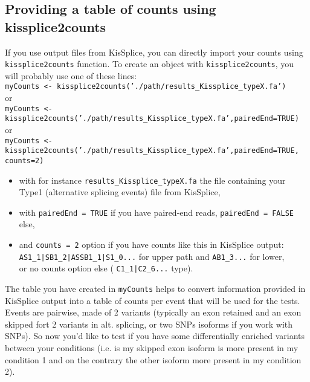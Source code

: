 \documentclass[english, a4paper, 12pt]{article}
\begin{document}

\subsection{Providing a table of counts using kissplice2counts}
If you use output files from KisSplice, you can directly import your counts using \texttt{kissplice2counts} function.
To create an object with \texttt{kissplice2counts}, you will probably use one of these lines:\\

  \texttt{myCounts <- kissplice2counts('./path/results\_Kissplice\_typeX.fa')}\\

or \\
  \texttt{myCounts <- kissplice2counts('./path/results\_Kissplice\_typeX.fa',pairedEnd=TRUE)}\\

or\\
  \texttt{myCounts <- kissplice2counts('./path/results\_Kissplice\_typeX.fa',pairedEnd=TRUE, counts=2)}\\

\begin{itemize}
\item with for instance \texttt{results\_Kissplice\_typeX.fa} the file containing your Type1 (alternative splicing events) file from KisSplice,
 \item  with \texttt{pairedEnd = TRUE} if you have paired-end reads, \texttt{pairedEnd = FALSE} else, 
 \item  and \texttt{counts = 2} option if you have counts like this in KisSplice output:\\
 \texttt{AS1\_1|SB1\_2|ASSB1\_1|S1\_0...} for upper path and \texttt{AB1\_3...} for lower,\\
      or no counts option else ( \texttt{C1\_1|C2\_6...} type).
\end{itemize}

The table you have created in \texttt{myCounts} helps to convert information provided in KisSplice output into a table of counts per event that will be used for the tests.\\
Events are pairwise, made of 2 variants (typically an exon retained and an exon skipped fort 2 variants in alt. splicing, or two SNPs isoforms if you work with SNPs). So now you'd like to test if you have some differentially enriched variants between your conditions (i.e. is my skipped exon isoform is more present in my condition 1 and on the contrary the other isoform more present in my condition 2).
\end{document}
